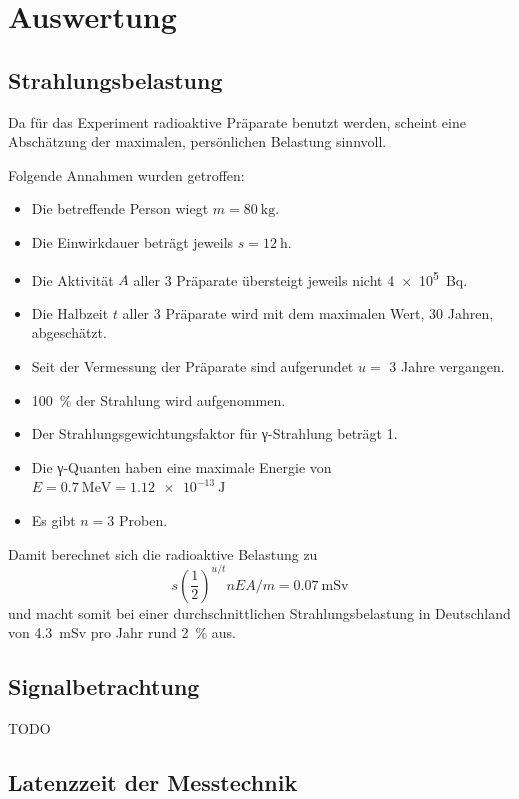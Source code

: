 \section{Auswertung}

\subsection{Strahlungsbelastung}

Da für das Experiment radioaktive Präparate benutzt werden, scheint eine
Abschätzung der maximalen, persönlichen Belastung sinnvoll.

Folgende Annahmen wurden getroffen:
\begin{itemize}
  \item Die betreffende Person wiegt $m = \SI{80}{\kilo\gram}$.
  \item Die Einwirkdauer beträgt jeweils $s = \SI{12}{\hour}$.
  \item Die Aktivität $A$ aller 3 Präparate übersteigt jeweils nicht
        \SI{4e5}{\becquerel}.
  \item Die Halbzeit $t$ aller 3 Präparate wird mit dem maximalen Wert, 30 Jahren,
        abgeschätzt.
  \item Seit der Vermessung der Präparate sind aufgerundet $u = $ 3 Jahre vergangen.
  \item \SI{100}{\percent} der Strahlung wird aufgenommen.
  \item Der Strahlungsgewichtungsfaktor für γ-Strahlung beträgt 1.
  \item Die γ-Quanten haben eine maximale Energie von
        $E = \SI{0.7}{\mega\eV} = \SI{1.12e-13}{\joule}$
  \item Es gibt $n = 3$ Proben.
\end{itemize}
Damit berechnet sich die radioaktive Belastung zu
\begin{equation}
  s \left(\frac{1}{2}\right)^{u/t} n E A / m = \SI{0.07}{\milli\sievert}
\end{equation}
und macht somit bei einer durchschnittlichen Strahlungsbelastung in Deutschland von
\SI{4.3}{\milli\sievert} pro Jahr rund \SI{2}{\percent} aus.

\subsection{Signalbetrachtung}
TODO

\subsection{Latenzzeit der Messtechnik}

